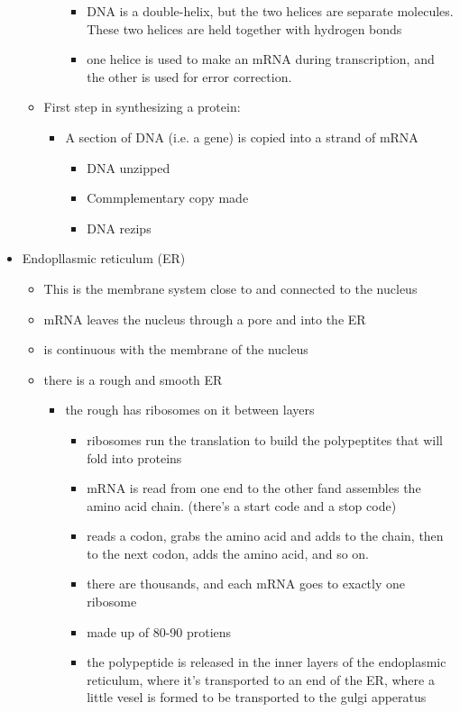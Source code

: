 \documentclass{article}
\theoremstyle{definition}
\begin{document}
\begin{itemize}
\begin{itemize}
\begin{itemize}
\begin{itemize}
							\item DNA is a double-helix, but the two helices are separate molecules. These two helices are held together with hydrogen bonds
							\item one helice is used to make an mRNA during transcription, and the other is used for error correction.
						\end{itemize}
				\end{itemize}
			\item First step in synthesizing a protein:
				\begin{itemize}
					\item A section of DNA (i.e. a gene) is copied into a strand of mRNA
						\begin{itemize}
							\item DNA unzipped
							\item Commplementary copy made 
							\item DNA rezips
						\end{itemize}
				\end{itemize}
		\end{itemize}
	\item Endopllasmic reticulum (ER)
		\begin{itemize}
			\item This is the membrane system close to and connected to the nucleus
			\item mRNA leaves the nucleus through a pore and into the ER
			\item is continuous with the membrane of the nucleus
			\item there is a rough and smooth ER
				\begin{itemize}
					\item the rough has ribosomes on it between layers
						\begin{itemize}
							\item ribosomes run the translation to build the polypeptites that will fold into proteins
							\item mRNA is read from one end to the other fand assembles the amino acid chain. (there's a start code and a stop code)
							\item reads a codon, grabs the amino acid and adds to the chain, then to the next codon, adds the amino acid, and so on.
							\item there are thousands, and each mRNA goes to exactly one ribosome
							\item made up of 80-90 protiens
							\item the polypeptide is released in the inner layers of the endoplasmic reticulum, where it's transported to an end of the ER, where a little vesel is formed to be transported to the gulgi apperatus

\end{itemize}
\end{itemize}
\end{itemize}
\end{itemize}
\end{document}
